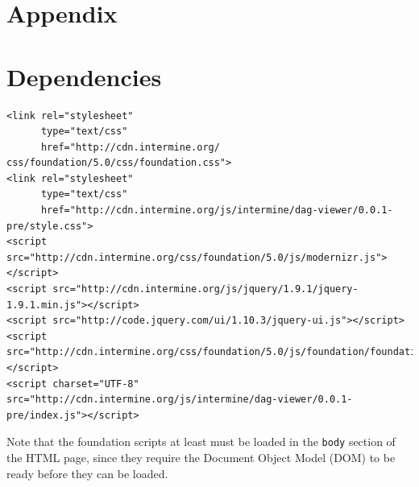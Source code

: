 \documentclass[10pt,a4paper,twocolumn]{article}
\begin{document}
\nocite{*}
{\small
}

\clearpage
\section*{Appendix}
\appendix

\section{Dependencies}
\label{sec:deps}

\lstset{language=HTML}
\begin{lstlisting}
<link rel="stylesheet"
      type="text/css"
      href="http://cdn.intermine.org/
css/foundation/5.0/css/foundation.css">
<link rel="stylesheet"
      type="text/css"
      href="http://cdn.intermine.org/js/intermine/dag-viewer/0.0.1-pre/style.css">
<script src="http://cdn.intermine.org/css/foundation/5.0/js/modernizr.js"></script>
<script src="http://cdn.intermine.org/js/jquery/1.9.1/jquery-1.9.1.min.js"></script>
<script src="http://code.jquery.com/ui/1.10.3/jquery-ui.js"></script>
<script src="http://cdn.intermine.org/css/foundation/5.0/js/foundation/foundation.js"></script>
<script charset="UTF-8" src="http://cdn.intermine.org/js/intermine/dag-viewer/0.0.1-pre/index.js"></script>
\end{lstlisting}

Note that the foundation scripts at least must be loaded in the
\texttt{body} section of the HTML page, since they require the
Document Object Model (DOM) to be ready before they can be loaded.






\end{document}
